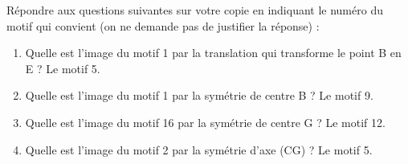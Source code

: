 \begin{enumerate}
Répondre aux questions suivantes sur votre copie en indiquant le numéro du motif qui convient (on ne demande pas de justifier la réponse) :

	\begin{enumerate}
		\item Quelle est l'image du motif 1 par la translation qui transforme le point B en E ? Le motif 5.
		\item Quelle est l'image du motif 1 par la symétrie de centre B ? Le motif 9.
		\item Quelle est l'image du motif 16 par la symétrie de centre G ? Le motif 12.
		\item Quelle est l'image du motif 2 par la symétrie d'axe (CG) ? Le motif 5.
	\end{enumerate}	
\end{enumerate}

\bigskip

